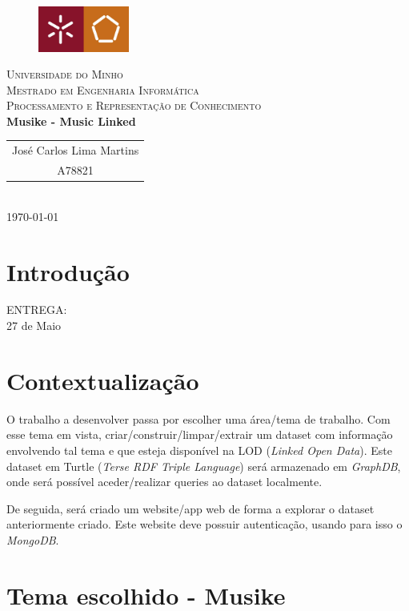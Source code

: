\documentclass{article}
\begin{document}
{
\center
\begin{figure}[H]
        \centering
        \includegraphics[width=3cm]{Pictures/UM_EENG.jpg}
\end{figure}
\textsc{\Large Universidade do Minho} \\ [0.5cm]
\textsc{\Large Mestrado em Engenharia Informática} \\ [0.5cm]
\textsc{\large Processamento e Representação de Conhecimento} \\ [0.5cm]

{\LARGE \bfseries Musike - Music Linked} \\[0.5cm]

\begin{tabular}{c} 
    José Carlos Lima Martins \\
    A78821 \\
\end{tabular} \\[0.5cm]

\today \\[1cm]
}

\section{Introdução}

ENTREGA:\\
27 de Maio\\

\section{Contextualização}

O trabalho a desenvolver passa por escolher uma área/tema de trabalho. Com esse tema em vista, criar/construir/limpar/extrair um dataset com informação envolvendo tal tema e que esteja disponível na LOD (\textit{Linked Open Data}). Este dataset em Turtle (\textit{Terse RDF Triple Language}) será armazenado em \textit{GraphDB}, onde será possível aceder/realizar queries ao dataset localmente.

De seguida, será criado um website/app web de forma a explorar o dataset anteriormente criado. Este website deve possuir autenticação, usando para isso o \textit{MongoDB}.

\section{Tema escolhido - \textbf{Musike}}
\end{document}
